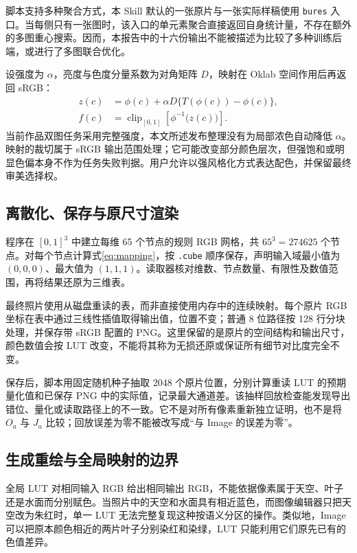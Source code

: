 脚本支持多种聚合方式，本 Skill 默认的一张原片与一张实际样稿使用 \texttt{bures} 入口。当每侧只有一张图时，该入口的单元素聚合直接返回自身统计量，不存在额外的多图重心搜索。因而，本报告中的十六份输出不能被描述为比较了多种训练后端，或进行了多图联合优化。

设强度为 $\alpha$，亮度与色度分量系数为对角矩阵 $D$，映射在 Oklab 空间作用后再返回 sRGB：
\begin{align}
 z(c)&=\phi(c)+\alpha D\{T(\phi(c))-\phi(c)\},\\
 f(c)&=\operatorname{clip}_{[0,1]}\left[\phi^{-1}\bigl(z(c)\bigr)\right].
 \label{eq:mapping}
\end{align}
当前作品双图任务采用完整强度，本文所述发布整理没有为局部浓色自动降低 $\alpha$。映射的裁切属于 sRGB 输出范围处理；它可能改变部分颜色层次，但强饱和或明显色偏本身不作为任务失败判据。用户允许以强风格化方式表达配色，并保留最终审美选择权。

\subsection{离散化、保存与原尺寸渲染}
程序在 $[0,1]^3$ 中建立每维 65 个节点的规则 RGB 网格，共 $65^3=274625$ 个节点。对每个节点计算式\eqref{eq:mapping}，按 \texttt{.cube} 顺序保存，声明输入域最小值为 $(0,0,0)$、最大值为 $(1,1,1)$。读取器核对维数、节点数量、有限性及数值范围，再将结果还原为三维表。

最终照片使用从磁盘重读的表，而非直接使用内存中的连续映射。每个原片 RGB 坐标在表中通过三线性插值取得输出值，位置不变；普通 8 位路径按 128 行分块处理，并保存带 sRGB 配置的 PNG。这里保留的是原片的空间结构和输出尺寸，颜色数值会按 LUT 改变，不能将其称为无损还原或保证所有细节对比度完全不变。

保存后，脚本用固定随机种子抽取 2048 个原片位置，分别计算重读 LUT 的预期量化值和已保存 PNG 中的实际值，记录最大通道差。该抽样回放检查能发现导出错位、量化或读取路径上的不一致。它不是对所有像素重新独立证明，也不是将 $O_a$ 与 $J_a$ 比较；回放误差为零不能被改写成“与 Image 的误差为零”。

\subsection{生成重绘与全局映射的边界}
全局 LUT 对相同输入 RGB 给出相同输出 RGB，不能依据像素属于天空、叶子还是水面而分别赋色。当照片中的天空和水面具有相近蓝色，而图像编辑器只把天空改为朱红时，单一 LUT 无法完整复现这种按语义分区的操作。类似地，Image 可以把原本颜色相近的两片叶子分别染红和染绿，LUT 只能利用它们原先已有的色值差异。

